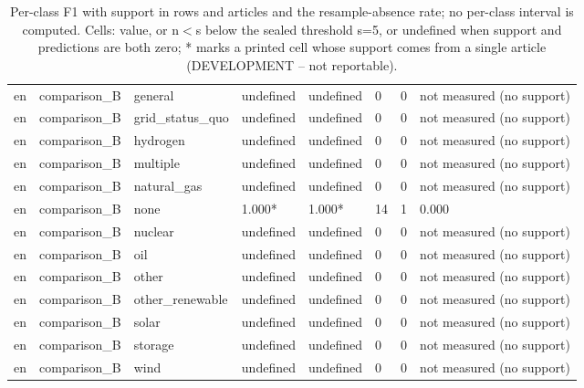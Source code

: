 \begin{table}[htbp]
\begin{tabular}{llllllll}
en & comparison\_B & general & undefined & undefined & 0 & 0 & not measured (no support) \\
en & comparison\_B & grid\_status\_quo & undefined & undefined & 0 & 0 & not measured (no support) \\
en & comparison\_B & hydrogen & undefined & undefined & 0 & 0 & not measured (no support) \\
en & comparison\_B & multiple & undefined & undefined & 0 & 0 & not measured (no support) \\
en & comparison\_B & natural\_gas & undefined & undefined & 0 & 0 & not measured (no support) \\
en & comparison\_B & none & 1.000* & 1.000* & 14 & 1 & 0.000 \\
en & comparison\_B & nuclear & undefined & undefined & 0 & 0 & not measured (no support) \\
en & comparison\_B & oil & undefined & undefined & 0 & 0 & not measured (no support) \\
en & comparison\_B & other & undefined & undefined & 0 & 0 & not measured (no support) \\
en & comparison\_B & other\_renewable & undefined & undefined & 0 & 0 & not measured (no support) \\
en & comparison\_B & solar & undefined & undefined & 0 & 0 & not measured (no support) \\
en & comparison\_B & storage & undefined & undefined & 0 & 0 & not measured (no support) \\
en & comparison\_B & wind & undefined & undefined & 0 & 0 & not measured (no support) \\
\bottomrule
\end{tabular}
\caption{Per-class F1 with support in rows and articles and the resample-absence rate; no per-class interval is computed. Cells: value, or n$<$s below the sealed threshold s=5, or undefined when support and predictions are both zero; * marks a printed cell whose support comes from a single article (DEVELOPMENT -- not reportable).}
\end{table}

